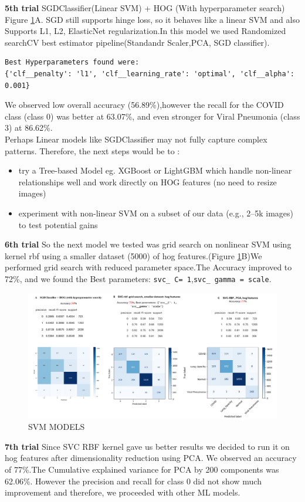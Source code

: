 \documentclass{article}
\begin{document}
\textbf{5th trial }SGDClassifier(Linear SVM) + HOG (With hyperparameter search) Figure \ref{fig:SVM_MODELS}A. SGD still supports hinge loss, so it behaves like a linear SVM and also Supports L1, L2, ElasticNet regularization.In this model we used Randomized searchCV best estimator pipeline(Standandr Scaler,PCA, SGD classifier). \begin{verbatim}
Best Hyperparameters found were:
{'clf__penalty': 'l1', 'clf__learning_rate': 'optimal', 'clf__alpha': 0.001}
\end{verbatim}
We observed low overall accuracy (56.89\%),however the recall for the COVID class (class 0) was better at 63.07\%, and even stronger for Viral Pneumonia (class 3) at 86.62\%.\\
Perhaps Linear models like SGDClassifier may not fully capture complex patterns.
Therefore, the next steps would be to :
\begin{itemize}
    \item try a Tree-based Model eg. XGBoost or LightGBM which handle non-linear relationships well and work directly on HOG features (no need to resize images)
    \item experiment with non-linear SVM on a subset of our data (e.g., 2–5k images) to test potential gains
\end{itemize}
\textbf{6th trial }So the next model we tested was grid search on nonlinear SVM using kernel rbf using a smaller dataset (5000) of hog features.(Figure \ref{fig:SVM_MODELS}B)We performed grid search with reduced parameter space.The Accuracy improved to 72\%, and we found the Best parameters: \texttt{svc\_ C= 1},\texttt {svc\_ gamma = scale}.
\\
\begin{figure}[htb!] %
    \centering
    \includegraphics[width=1.0\linewidth]{svm ABC.png}
    \caption{SVM MODELS}
    \label{fig:SVM_MODELS}
\end{figure}
\textbf{7th trial }Since SVC\- RBF kernel gave us better results we decided to run it on hog features after dimensionality reduction using PCA. We observed an accuracy of 77\%.The Cumulative explained variance for PCA by 200 components was 62.06\%. However the precision and recall for class 0 did not show much improvement and therefore, we proceeded with other ML models.\\
\end{document}
